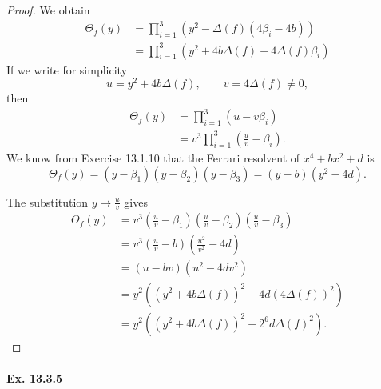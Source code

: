 \documentclass[11pt,a4paper]{article}
\begin{document}
\begin{proof}
We obtain
\begin{align*}
\Theta_f(y) &= \prod_{i=1}^3 \left(y^2  - \Delta(f) (4\beta_i - 4b)\right)\\
&=\prod_{i=1}^3 (y^2 + 4b\Delta(f) - 4 \Delta(f) \beta_i)
\end{align*}
If we write for simplicity
$$ u = y^2 + 4b\Delta(f),\qquad v = 4 \Delta(f) \ne 0 ,$$
then
\begin{align*}
\Theta_f(y) &=\prod_{i=1}^3 (u - v \beta_i)\\
&=v^3 \prod_{i=1}^3 \left(\frac{u}{v} - \beta_i\right).
\end{align*}
We know from Exercise 13.1.10 that the Ferrari resolvent of $x^4+bx^2 + d$ is
$$\Theta_f(y) = (y - \beta_1)(y-\beta_2)(y - \beta_3) =  (y-b)(y^2 - 4d).$$

The substitution $y \mapsto \frac{u}{v}$ gives
\begin{align*}
\Theta_f(y) &=v^3\left(\frac{u}{v} - \beta_1\right)\left(\frac{u}{v} - \beta_2\right)\left(\frac{u}{v} - \beta_3\right)\\
&= v^3\left(\frac{u}{v} - b\right) \left( \frac{u^2}{v^2} - 4d \right)\\
&=(u-bv)(u^2 - 4d v^2)\\
&= y^2 \left((y^2 + 4b \Delta(f))^2 -4d(4 \Delta(f))^2\right)\\
&= y^2 \left((y^2 + 4b \Delta(f))^2 - 2^6 d \Delta(f)^2 \right).
\end{align*}


\end{proof}




\paragraph{Ex. 13.3.5}
\end{document}
